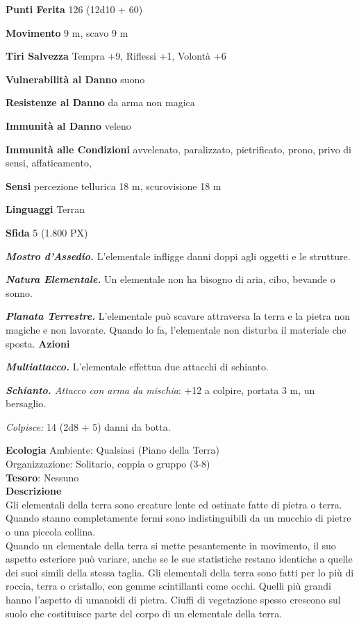 \begin{multicols}{2}
\textbf{Punti Ferita} 126 (12d10 + 60)

\textbf{Movimento} 9 m, scavo 9 m

\textbf{Tiri Salvezza} Tempra +9, Riflessi +1, Volontà +6

\textbf{Vulnerabilità al Danno} suono

\textbf{Resistenze al Danno} da arma non magica

\textbf{Immunità al Danno} veleno

\textbf{Immunità alle Condizioni} avvelenato, paralizzato, pietrificato, prono, privo di sensi, affaticamento,

\textbf{Sensi} percezione tellurica 18 m, scurovisione 18 m

\textbf{Linguaggi} Terran

\textbf{Sfida} 5 (1.800 PX)

\textit{\textbf{Mostro d'Assedio.}} L'elementale infligge danni doppi agli oggetti e le strutture.

\textit{\textbf{Natura Elementale.}} Un elementale non ha bisogno di aria, cibo, bevande o sonno.

\textit{\textbf{Planata Terrestre.}} L'elementale può scavare attraversa la terra e la pietra non magiche e non lavorate. Quando lo fa, l'elementale non disturba il materiale che sposta.
\textbf{Azioni}

\textit{\textbf{Multiattacco.}} L'elementale effettua due attacchi di schianto.

\textit{\textbf{Schianto.} Attacco con arma da mischia}: +12 a colpire, portata 3 m, un bersaglio.

\textit{Colpisce:} 14 (2d8 + 5) danni da botta.

\textbf{Ecologia}
Ambiente: Qualsiasi (Piano della Terra)\\
Organizzazione: Solitario, coppia o gruppo (3-8)\\
\textbf{Tesoro}: Nessuno\\
\textbf{Descrizione}\\
Gli elementali della terra sono creature lente ed ostinate fatte di pietra o terra. Quando stanno completamente fermi sono indistinguibili da un mucchio di pietre o una piccola collina.\\

Quando un elementale della terra si mette pesantemente in movimento, il suo aspetto esteriore può variare, anche se le sue statistiche restano identiche a quelle dei suoi simili della stessa taglia. Gli elementali della terra sono fatti per lo più di roccia, terra o cristallo, con gemme scintillanti come occhi. Quelli più grandi hanno l'aspetto di umanoidi di pietra. Ciuffi di vegetazione spesso crescono sul suolo che costituisce parte del corpo di un elementale della terra.\\


\end{multicols}
